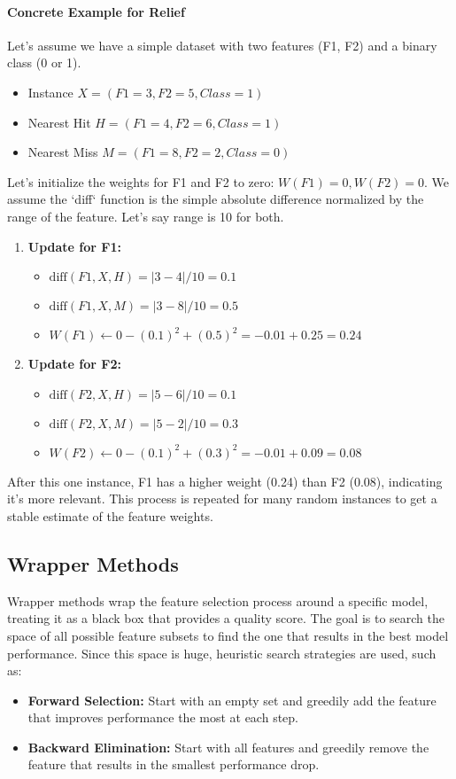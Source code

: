 \documentclass{article}
\begin{document}
\begin{multicols}{2}
\paragraph{Concrete Example for Relief}
Let's assume we have a simple dataset with two features (F1, F2) and a binary class (0 or 1).
\begin{itemize}
    \item Instance $X = (F1=3, F2=5, Class=1)$
    \item Nearest Hit $H = (F1=4, F2=6, Class=1)$
    \item Nearest Miss $M = (F1=8, F2=2, Class=0)$
\end{itemize}
Let's initialize the weights for F1 and F2 to zero: $W(F1)=0, W(F2)=0$. We assume the `diff` function is the simple absolute difference normalized by the range of the feature. Let's say range is 10 for both.
\begin{enumerate}
    \item \textbf{Update for F1:}
    \begin{itemize}
        \item $\text{diff}(F1, X, H) = |3 - 4| / 10 = 0.1$
        \item $\text{diff}(F1, X, M) = |3 - 8| / 10 = 0.5$
        \item $W(F1) \leftarrow 0 - (0.1)^2 + (0.5)^2 = -0.01 + 0.25 = 0.24$
    \end{itemize}
    \item \textbf{Update for F2:}
     \begin{itemize}
        \item $\text{diff}(F2, X, H) = |5 - 6| / 10 = 0.1$
        \item $\text{diff}(F2, X, M) = |5 - 2| / 10 = 0.3$
        \item $W(F2) \leftarrow 0 - (0.1)^2 + (0.3)^2 = -0.01 + 0.09 = 0.08$
    \end{itemize}
\end{enumerate}
After this one instance, F1 has a higher weight (0.24) than F2 (0.08), indicating it's more relevant. This process is repeated for many random instances to get a stable estimate of the feature weights.

\subsection{Wrapper Methods}
Wrapper methods wrap the feature selection process around a specific model, treating it as a black box that provides a quality score. The goal is to search the space of all possible feature subsets to find the one that results in the best model performance. Since this space is huge, heuristic search strategies are used, such as:
\begin{itemize}
    \item \textbf{Forward Selection:} Start with an empty set and greedily add the feature that improves performance the most at each step.
    \item \textbf{Backward Elimination:} Start with all features and greedily remove the feature that results in the smallest performance drop.
\end{itemize}


\end{multicols}
\end{document}
